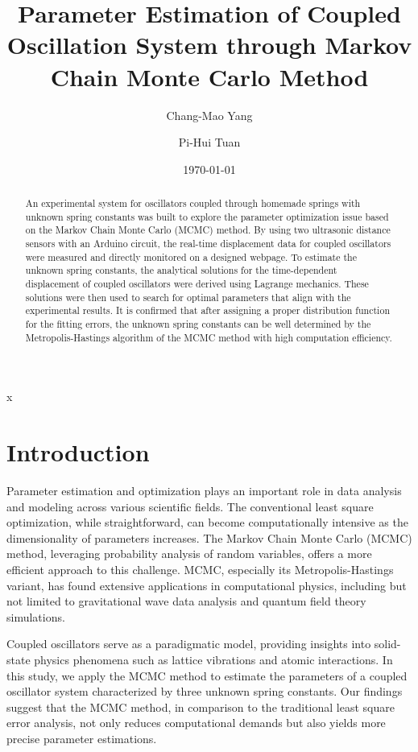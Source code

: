 x\documentclass[12pt, a4paper, reprint, nofootinbib, twoside,  showkeys]{revtex4-1}
\begin{document}
	\title{Parameter Estimation of Coupled Oscillation System through Markov Chain Monte Carlo Method}
	\author{Chang-Mao Yang}
	\author{Pi-Hui Tuan}
	
	\date{\today}
\begin{abstract}
	An experimental system for oscillators coupled through homemade springs with unknown spring constants was built to explore the parameter optimization issue based on the Markov Chain Monte Carlo (MCMC) method. By using two ultrasonic distance sensors with an Arduino circuit, the real-time displacement data for coupled oscillators were measured and directly monitored on a designed webpage. To estimate the unknown spring constants, the analytical solutions for the time-dependent displacement of coupled oscillators were derived using Lagrange mechanics. These solutions were then used to search for optimal parameters that align with the experimental results. It is confirmed that after assigning a proper distribution function for the fitting errors, the unknown spring constants can be well determined by the Metropolis-Hastings algorithm of the MCMC method with high computation efficiency.
\end{abstract}
	\maketitle
\section{Introduction}
	Parameter estimation and optimization plays an important role in data analysis and modeling across various scientific fields. The conventional least square optimization, while straightforward, can become computationally intensive as the dimensionality of parameters increases. The Markov Chain Monte Carlo (MCMC) method, leveraging probability analysis of random variables, offers a more efficient approach to this challenge. MCMC, especially its Metropolis-Hastings variant, has found extensive applications in computational physics, including but not limited to gravitational wave data analysis and quantum field theory simulations.

Coupled oscillators serve as a paradigmatic model, providing insights into solid-state physics phenomena such as lattice vibrations and atomic interactions. In this study, we apply the MCMC method to estimate the parameters of a coupled oscillator system characterized by three unknown spring constants. Our findings suggest that the MCMC method, in comparison to the traditional least square error analysis, not only reduces computational demands but also yields more precise parameter estimations.
\end{document}
